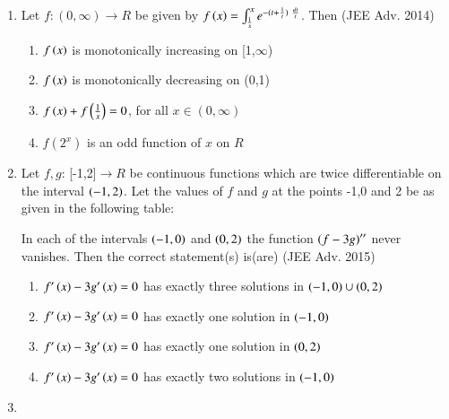 \documentclass[journal]{IEEEtran}
\begin{document}
\begin{enumerate}
{        %
        
        }
    \item{
        
            Let $f: (0,\infty)\rightarrow R$ be given by $f\left(x\right) = \int_{\frac{1}{x}}^x e^{-(t + \frac{1}{t})\ \frac{dt}{t}}$. Then
             \hfill
                {(JEE Adv. 2014)}
            \begin{multicols}{2}
                \begin{enumerate}
                    \item $f\left(x\right)$ is monotonically increasing on [1,$\infty$)
                    \item $f\left(x\right)$ is monotonically decreasing on (0,1)
                    \item $f\left(x\right) + f\left(\frac{1}{x}\right) = 0$, for all $x \in (0,\infty)$
                    \item $f(2^x)$ is an odd function of $x$ on $R$ 
                \end{enumerate}
            \end{multicols}
        
        }
    \item{
        
            Let $f,g$: [-1,2]$\rightarrow R$ be continuous functions which are twice differentiable on the interval $\left(-1,2\right)$. Let the values of $f$ and $g$ at the points -1,0 and 2 be as given in the following table:
            
            In each of the intervals $\left(-1,0\right)$ and $\left(0,2\right)$ the function $\left(f-3g\right)''$ never vanishes. Then the correct statement(s) is(are)
             \hfill
                {(JEE Adv. 2015)}
            
            \begin{enumerate}
                \item $f'\left(x\right) - 3g'\left(x\right) = 0$ has exactly three solutions in $\left(-1,0\right)\cup\left(0,2\right)$
                \item $f'\left(x\right) - 3g'\left(x\right) = 0$ has exactly one solution in $\left(-1,0\right)$
                \item $f'\left(x\right) - 3g'\left(x\right) = 0$ has exactly one solution in $\left(0,2\right)$
                \item $f'\left(x\right) - 3g'\left(x\right) = 0$ has exactly two solutions in $\left(-1,0\right)$
            \end{enumerate}
        
        }
    \item{
        
}
\end{enumerate}
\end{document}
